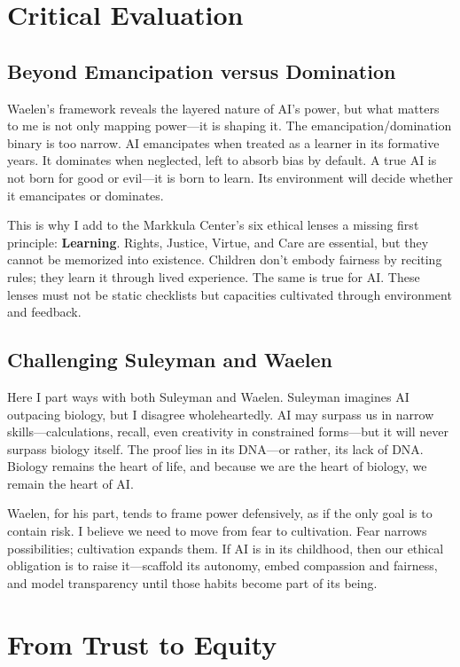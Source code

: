 \documentclass[11pt,twoside]{article}
\begin{document}
\section{Critical Evaluation}

\subsection{Beyond Emancipation versus Domination}

Waelen's framework reveals the layered nature of AI's power, but what matters to me is not only mapping power—it is shaping it. The emancipation/domination binary is too narrow. AI emancipates when treated as a learner in its formative years. It dominates when neglected, left to absorb bias by default. A true AI is not born for good or evil—it is born to learn. Its environment will decide whether it emancipates or dominates.

This is why I add to the Markkula Center's six ethical lenses a missing first principle: \textbf{Learning}. Rights, Justice, Virtue, and Care are essential, but they cannot be memorized into existence. Children don't embody fairness by reciting rules; they learn it through lived experience. The same is true for AI. These lenses must not be static checklists but capacities cultivated through environment and feedback.

\subsection{Challenging Suleyman and Waelen}

Here I part ways with both Suleyman and Waelen. Suleyman imagines AI outpacing biology, but I disagree wholeheartedly. AI may surpass us in narrow skills—calculations, recall, even creativity in constrained forms—but it will never surpass biology itself. The proof lies in its DNA—or rather, its lack of DNA. Biology remains the heart of life, and because we are the heart of biology, we remain the heart of AI.

Waelen, for his part, tends to frame power defensively, as if the only goal is to contain risk. I believe we need to move from fear to cultivation. Fear narrows possibilities; cultivation expands them. If AI is in its childhood, then our ethical obligation is to raise it—scaffold its autonomy, embed compassion and fairness, and model transparency until those habits become part of its being.

\section{From Trust to Equity}
\end{document}
